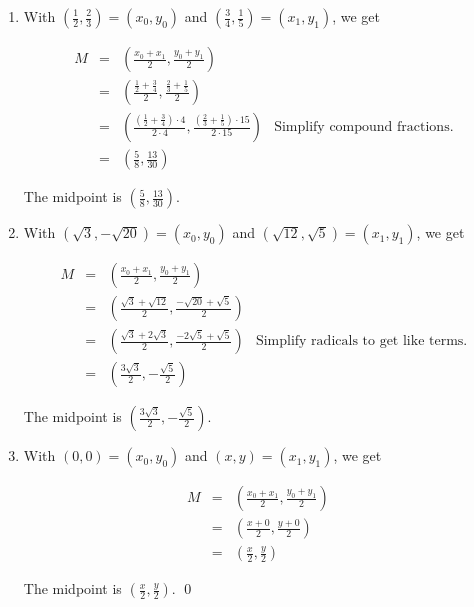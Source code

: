 \documentclass{ximera}
\begin{document}
\begin{example}
\begin{enumerate}
The midpoint is  $\left(- \frac{1}{2}, 0 \right)$.  

\item With $\left( \frac{1}{2}, \frac{2}{3}\right) =  \left(x_0, y_0\right)$ and  $\left( \frac{3}{4}, \frac{1}{5}\right) = \left(x_1, y_1\right)$, we get

\setlength{\extrarowheight}{10pt}

\[ \begin{array}{rclr}
 M & = & \left( \frac{x_0+x_1}{2},  \frac{y_0+y_1}{2} \right) & \\
   & = & \left( \frac{\frac{1}{2} + \frac{3}{4}}{2},  \frac{\frac{2}{3} + \frac{1}{5}}{2} \right) &   \\
   & = &  \left( \frac{\left(\frac{1}{2} + \frac{3}{4}\right) \cdot 4}{2 \cdot 4},  \frac{\left(\frac{2}{3} + \frac{1}{5}\right) \cdot 15}{2 \cdot 15} \right) & \text{Simplify compound fractions.} \\ 
   & = & \left(\frac{5}{8}, \frac{13}{30} \right) &  \end{array} \]
   
   

The midpoint is $\left(\frac{5}{8}, \frac{13}{30} \right)$.

\item   With $(\sqrt{3}, -\sqrt{20}) =  \left(x_0, y_0\right)$ and  $(\sqrt{12}, \sqrt{5}) = \left(x_1, y_1\right)$, we get

\setlength{\extrarowheight}{10pt}

\[ \begin{array}{rclr}
 M & = & \left( \frac{x_0+x_1}{2},  \frac{y_0+y_1}{2} \right) & \\
   & = & \left( \frac{\sqrt{3} + \sqrt{12}}{2},  \frac{-\sqrt{20}+\sqrt{5}}{2} \right) &   \\
   & = &  \left( \frac{\sqrt{3}+2\sqrt{3}}{2},  \frac{-2\sqrt{5} + \sqrt{5}}{2} \right) & \text{Simplify radicals to get like terms.} \\ 
   & = & \left(\frac{3\sqrt{3}}{2}, -\frac{\sqrt{5}}{2} \right) &  \end{array} \]
   
   The midpoint is $\left(\frac{3\sqrt{3}}{2}, -\frac{\sqrt{5}}{2} \right)$.

\item With $(0,0) =  \left(x_0, y_0\right)$ and  $(x,y) = \left(x_1, y_1\right)$, we get

\setlength{\extrarowheight}{10pt}

\[ \begin{array}{rclr}
 M & = & \left( \frac{x_0+x_1}{2},  \frac{y_0+y_1}{2} \right) & \\
   & = & \left( \frac{x+0}{2},  \frac{y+0}{2} \right) &   \\
   & = &  \left( \frac{x}{2},  \frac{y}{2} \right) &  \end{array} \]
   
 The midpoint is $\left(\frac{x}{2}, \frac{y}{2} \right)$. \qed

\end{enumerate}

\end{example}
\end{document}
